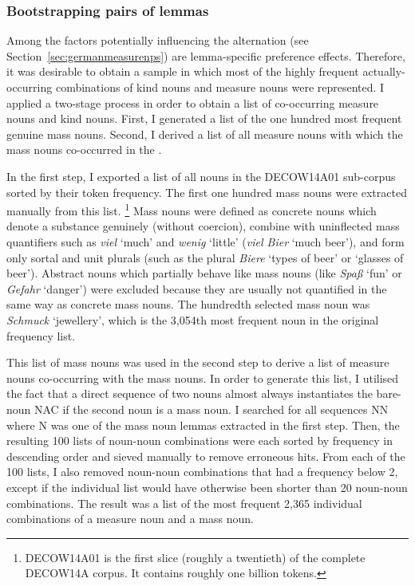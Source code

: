 \subsubsection{Bootstrapping pairs of lemmas}
\label{sec:bootstrappinlemmapairs}

Among the factors potentially influencing the alternation (see Section~\ref{sec:germanmeasurenps}) are lemma-specific preference effects.
Therefore, it was desirable to obtain a sample in which most of the highly frequent actually-occurring combinations of kind nouns and measure nouns were represented.
I applied a two-stage process in order to obtain a list of co-occurring measure nouns and kind nouns.
First, I generated a list of the one hundred most frequent genuine mass nouns.
Second, I derived a list of all measure nouns with which the mass nouns co-occurred in the \NACb.

In the first step, I exported a list of all nouns in the DECOW14A01 sub-corpus sorted by their token frequency.
The first one hundred mass nouns were extracted manually from this list.%
\footnote{DECOW14A01 is the first slice (roughly a twentieth) of the complete DECOW14A corpus.
It contains roughly one billion tokens.}
Mass nouns were defined as concrete nouns which denote a substance genuinely (without coercion), combine with uninflected mass quantifiers such as \textit{viel} `much' and \textit{wenig} `little' (\textit{viel Bier} `much beer'), and form only sortal and unit plurals (such as the plural \textit{Biere} `types of beer' or `glasses of beer').
Abstract nouns which partially behave like mass nouns (like \textit{Spaß} `fun’ or \textit{Gefahr} `danger’) were excluded because they are usually not quantified in the same way as concrete mass nouns.
The hundredth selected mass noun was \textit{Schmuck} `jewellery’, which is the 3,054th most frequent noun in the original frequency list.

This list of mass nouns was used in the second step to derive a list of measure nouns co-occurring with the mass nouns. 
In order to generate this list, I utilised the fact that a direct sequence of two nouns almost always instantiates the bare-noun NAC if the second noun is a mass noun.
I searched for all sequences NN where N was one of the mass noun lemmas extracted in the first step.
Then, the resulting 100 lists of noun-noun combinations were each sorted by frequency in descending order and sieved manually to remove erroneous hits.
From each of the 100 lists, I also removed noun-noun combinations that had a frequency below 2, except if the individual list would have otherwise been shorter than 20 noun-noun combinations.
The result was a list of the most frequent 2,365 individual combinations of a measure noun and a mass noun.

